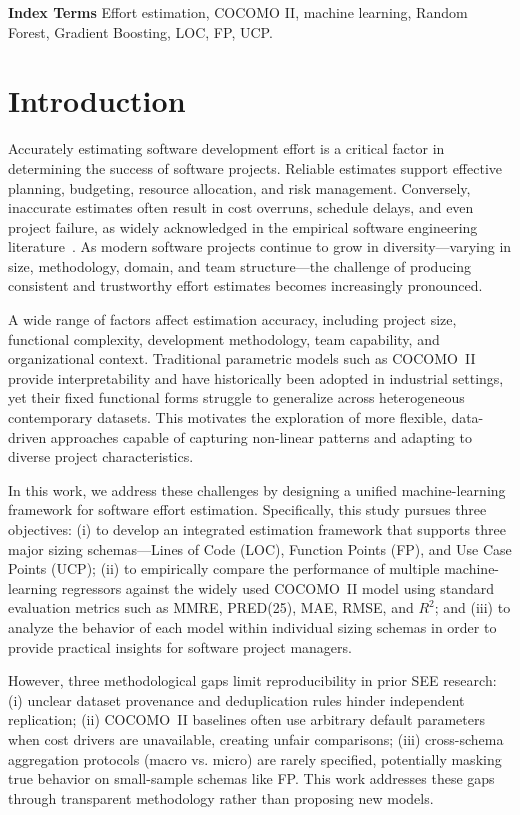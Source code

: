 \documentclass[11pt,a4paper]{article}
\begin{document}
\noindent\textbf{Index Terms} Effort estimation, COCOMO II, machine learning, Random Forest, Gradient Boosting, LOC, FP, UCP.

\section{Introduction}

Accurately estimating software development effort is a critical factor in determining the success of software projects. Reliable estimates support effective planning, budgeting, resource allocation, and risk management. Conversely, inaccurate estimates often result in cost overruns, schedule delays, and even project failure, as widely acknowledged in the empirical software engineering literature~\cite{boehm2000cocomo}. As modern software projects continue to grow in diversity—varying in size, methodology, domain, and team structure—the challenge of producing consistent and trustworthy effort estimates becomes increasingly pronounced.

A wide range of factors affect estimation accuracy, including project size, functional complexity, development methodology, team capability, and organizational context. Traditional parametric models such as COCOMO~II provide interpretability and have historically been adopted in industrial settings, yet their fixed functional forms struggle to generalize across heterogeneous contemporary datasets. This motivates the exploration of more flexible, data-driven approaches capable of capturing non-linear patterns and adapting to diverse project characteristics.

In this work, we address these challenges by designing a unified machine-learning framework for software effort estimation. Specifically, this study pursues three objectives: (i) to develop an integrated estimation framework that supports three major sizing schemas—Lines of Code (LOC), Function Points (FP), and Use Case Points (UCP); (ii) to empirically compare the performance of multiple machine-learning regressors against the widely used COCOMO~II model using standard evaluation metrics such as MMRE, PRED(25), MAE, RMSE, and $R^2$; and (iii) to analyze the behavior of each model within individual sizing schemas in order to provide practical insights for software project managers.

However, three methodological gaps limit reproducibility in prior SEE research: (i) unclear dataset provenance and deduplication rules hinder independent replication; (ii) COCOMO~II baselines often use arbitrary default parameters when cost drivers are unavailable, creating unfair comparisons; (iii) cross-schema aggregation protocols (macro vs. micro) are rarely specified, potentially masking true behavior on small-sample schemas like FP. This work addresses these gaps through transparent methodology rather than proposing new models.
\end{document}

